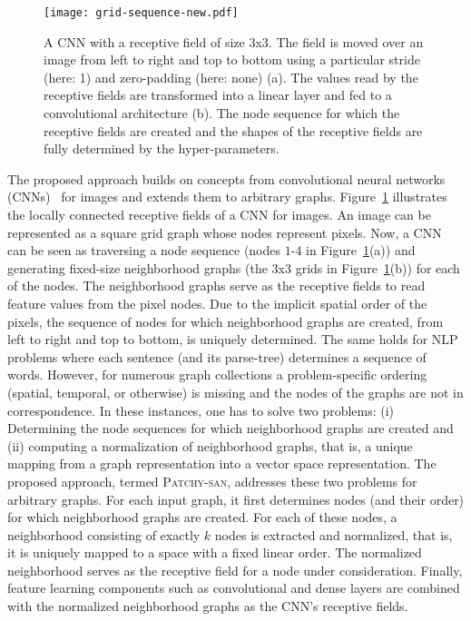 \documentclass{article}
\newcommand{\patchysan}{{\textsc{Patchy-san}}\xspace}
\begin{document}
\begin{figure}
\centering
\texttt{[image: grid-sequence-new.pdf]}
\caption{\label{fig-grid} A CNN with a receptive field of size $3$x$3$. The field is moved over an image from left to right and top to bottom using a particular stride (here: 1) and zero-padding (here: none) (a). The values read by the receptive fields are transformed into a linear layer and fed to a convolutional architecture (b). The node sequence for which the receptive fields are created and the shapes of the receptive fields are fully determined by the hyper-parameters.}
\end{figure}

The proposed approach builds on concepts from convolutional neural networks (CNNs)~\cite{Kunihiko:1980,atlas:1987,lecun:1998,lecun:2015} for images and extends them to arbitrary graphs. 
Figure~\ref{fig-grid} illustrates the locally connected receptive fields of a CNN for images. An image can be represented as a square grid graph whose nodes represent pixels. Now, a CNN can be seen as traversing a node sequence (nodes $1$-$4$ in Figure~\ref{fig-grid}(a)) and  generating fixed-size neighborhood graphs (the $3$x$3$ grids in Figure~\ref{fig-grid}(b)) for each of the nodes. The neighborhood graphs serve as the receptive fields to read feature values from the pixel nodes. Due to the implicit spatial order of the pixels, the sequence of nodes for which neighborhood graphs are created, from left to right and top to bottom, is uniquely determined. The same holds for NLP problems where each sentence (and its parse-tree) determines a sequence of words. However, for numerous graph collections a problem-specific ordering (spatial, temporal, or otherwise) is missing and the nodes of the  graphs are not in correspondence. In these instances, one has to  solve two problems: (i) Determining the node sequences for which neighborhood graphs are created and (ii) computing a normalization of neighborhood graphs, that is, a unique mapping from a graph representation into a vector space representation. 
The proposed approach, termed \patchysan, addresses these two problems for arbitrary graphs. For each input graph, it first determines nodes (and their order) for which neighborhood graphs are created. For each of these nodes, a neighborhood consisting of exactly $k$ nodes is extracted and normalized, that is, it is uniquely mapped to a space with a fixed linear order. The normalized neighborhood serves as the receptive field for a node under consideration. Finally, feature learning components such as convolutional and dense layers are combined with the normalized neighborhood graphs as the CNN's receptive fields.
\end{document}
